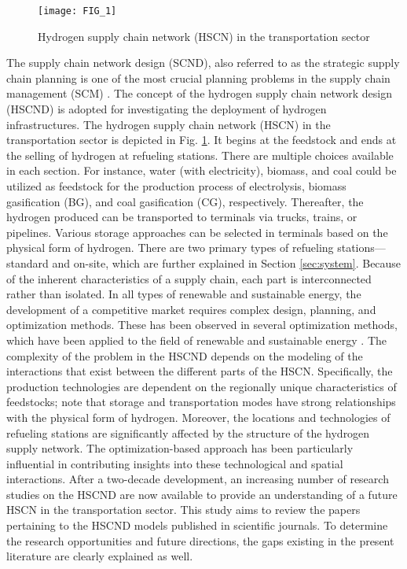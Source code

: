 \documentclass[11pt,3p]{elsarticle}
\begin{document}
\begin{figure}[!htbp]
\centering
\texttt{[image: FIG\_1]}
\caption{\label{fig:NetworkRepresentHSC}Hydrogen supply chain network (HSCN) in the transportation sector}
\end{figure}

The supply chain network design (SCND), also referred to as the strategic supply chain planning is one of the most crucial planning problems in the supply chain management (SCM) \citep{govindan2017supply}. The concept of the hydrogen supply chain network design (HSCND) is adopted for investigating the deployment of hydrogen infrastructures. The hydrogen supply chain network (HSCN) in the transportation sector is depicted in Fig. \ref{fig:NetworkRepresentHSC}. It begins at the feedstock and ends at the selling of hydrogen at refueling stations. There are multiple choices available in each section. For instance, water (with electricity), biomass, and coal could be utilized as feedstock for the production process of electrolysis, biomass gasification (BG), and coal gasification (CG), respectively. Thereafter, the hydrogen produced can be transported to terminals via trucks, trains, or pipelines. Various storage approaches can be selected in terminals based on the physical form of hydrogen. There are two primary types of refueling stations---standard and on-site, which are further explained in Section \ref{sec:system}. Because of the inherent characteristics of a supply chain, each part is interconnected rather than isolated. In all types of renewable and sustainable energy, the development of a competitive market requires complex design, planning, and optimization methods. These has been observed in several optimization methods, which have been applied to the field of renewable and sustainable energy \citep{banos2011optimization,de2014methods}. The complexity of the problem in the HSCND depends on the modeling of the interactions that exist between the different parts of the HSCN. Specifically, the production technologies are dependent on the regionally unique characteristics of feedstocks; note that storage and transportation modes have strong relationships with the physical form of hydrogen. Moreover, the locations and technologies of refueling stations are significantly affected by the structure of the hydrogen supply network. The optimization-based approach has been particularly influential in contributing insights into these technological and spatial interactions. After a two-decade development, an increasing number of research studies on the HSCND are now available to provide an understanding of a future HSCN in the transportation sector. This study aims to review the papers pertaining to the HSCND models published in scientific journals. To determine the research opportunities and future directions, the gaps existing in the present literature are clearly explained as well.
\end{document}
